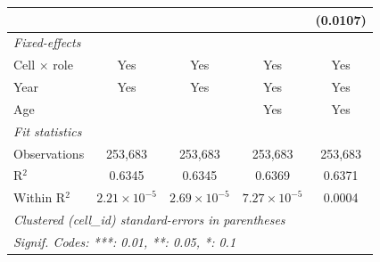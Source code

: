 \begin{table}[htbp]
\begin{tabular}{lcccc}
                                       &                       &                       &                       & (0.0107)\\   
      \midrule
      \emph{Fixed-effects}\\
      Cell $\times$ role               & Yes                   & Yes                   & Yes                   & Yes\\  
      Year                             & Yes                   & Yes                   & Yes                   & Yes\\  
      Age                              &                       &                       & Yes                   & Yes\\  
      \midrule
      \emph{Fit statistics}\\
      Observations                     & 253,683               & 253,683               & 253,683               & 253,683\\  
      R$^2$                            & 0.6345                & 0.6345                & 0.6369                & 0.6371\\  
      Within R$^2$                     & $2.21\times 10^{-5}$  & $2.69\times 10^{-5}$  & $7.27\times 10^{-5}$  & 0.0004\\  
      \midrule \midrule
      \multicolumn{5}{l}{\emph{Clustered (cell\_id) standard-errors in parentheses}}\\
      \multicolumn{5}{l}{\emph{Signif. Codes: ***: 0.01, **: 0.05, *: 0.1}}\\
   \end{tabular}
\end{table}


